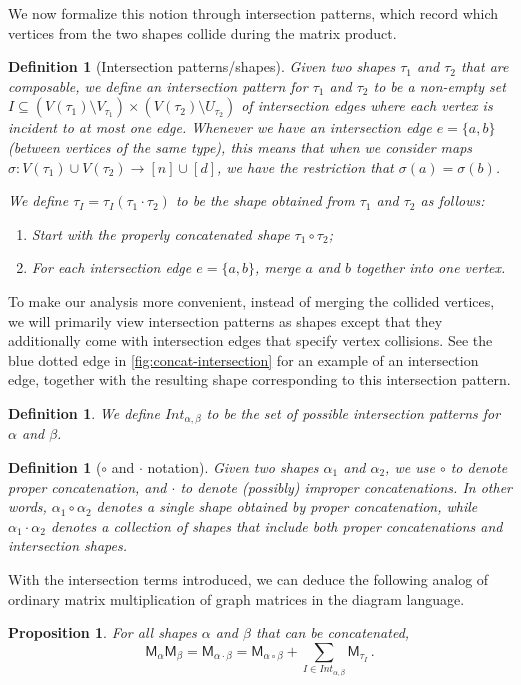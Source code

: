 \documentclass[12pt]{article}
\def \al {\alpha}
\newtheorem{proposition}[theorem]{Proposition}
\newtheorem{definition}[theorem]{Definition}
\newcommand{\cm}{\mathsf{M} }
\newcommand{\Authornote}[3]{{\sf\footnotesize\color{#3}{[#1: #2]}}}
\newcommand{\Authornote}[3]{}
\newcommand{\anote}[1]{\Authornote{Aaron}{#1}{cyan}}
\newcommand{\snote}[1]{\Authornote{Sofia}{#1}{orange}}
\begin{document}
We now formalize this notion through intersection patterns, which record which vertices from the two shapes collide during the matrix product.
\begin{definition}[Intersection patterns/shapes]
Given two shapes $\tau_1$ and $\tau_2$ that are composable, we define an intersection pattern for $\tau_1$ and $\tau_2$ to be a non-empty set $I \subseteq \left(V(\tau_1) \setminus V_{\tau_1}\right) \times \left(V(\tau_2) \setminus U_{\tau_2}\right)$ of intersection edges where each vertex is incident to at most one edge. Whenever we have an intersection edge $e = \{a,b\}$ (between vertices of the same type), this means that when we consider maps $\sigma: V(\tau_1) \cup V(\tau_2) \to [n]\cup [d] $, we have the restriction that $\sigma(a) = \sigma(b)$.

We define $\tau_{I} = \tau_{I}(\tau_1\cdot \tau_2)$ to be the shape obtained from $\tau_1$ and $\tau_2$ as follows:
\begin{enumerate}
\item Start with the properly concatenated shape $\tau_1\circ \tau_2$;
\item For each intersection edge $e = \{a,b\}$, merge $a$ and $b$ together into one vertex.
\end{enumerate}
\end{definition}
To make our analysis more convenient, instead of merging the collided vertices, we will primarily view intersection patterns as shapes except that they additionally come with intersection edges that specify vertex collisions. See the blue dotted edge in \cref{fig:concat-intersection} for an example of an intersection edge, together with the resulting shape corresponding to this
intersection pattern.
\begin{definition}
We define $Int_{\alpha,\beta}$ to be the set of possible intersection patterns for $\alpha$ and $\beta$.
\end{definition}

\begin{definition}[$\circ$ and $\cdot$ notation]
	Given two shapes $\al_1$ and $\al_2$, we use $\circ$ to denote proper concatenation, and $\cdot $ to denote (possibly) improper concatenations. In other words, $\al_1\circ  \al_2$ denotes a single shape obtained by proper concatenation, while $\al_1\cdot \al_2$ denotes a collection of shapes that include both proper concatenations and intersection shapes.
\end{definition}
With the intersection terms introduced, we can deduce the following analog of ordinary matrix multiplication of graph matrices in the diagram language.
\begin{proposition}
For all shapes $\alpha$ and $\beta$ that can be concatenated, \[
{\cm}_{\alpha}{\cm}_{\beta}  = \cm_{\al\cdot \beta}   = {\cm}_{\alpha \circ \beta} + \sum_{I \in Int_{\alpha,\beta}}{{\cm_{\tau_I}}}\,.\]
\end{proposition}
\end{document}
